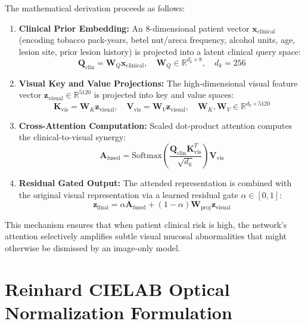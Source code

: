\documentclass[12pt,a4paper,oneside]{report}
\begin{document}
The mathematical derivation proceeds as follows:
\begin{enumerate}
    \item \textbf{Clinical Prior Embedding:} An 8-dimensional patient vector $\mathbf{x}_{\text{clinical}}$ (encoding tobacco pack-years, betel nut/areca frequency, alcohol units, age, lesion site, prior lesion history) is projected into a latent clinical query space:
    \begin{equation}
        \mathbf{Q}_{\text{clin}} = \mathbf{W}_Q \mathbf{x}_{\text{clinical}}, \quad \mathbf{W}_Q \in \mathbb{R}^{d_k \times 8}, \quad d_k = 256
    \end{equation}
    \item \textbf{Visual Key and Value Projections:} The high-dimensional visual feature vector $\mathbf{z}_{\text{visual}} \in \mathbb{R}^{5120}$ is projected into key and value spaces:
    \begin{equation}
        \mathbf{K}_{\text{vis}} = \mathbf{W}_K \mathbf{z}_{\text{visual}}, \quad \mathbf{V}_{\text{vis}} = \mathbf{W}_V \mathbf{z}_{\text{visual}}, \quad \mathbf{W}_K, \mathbf{W}_V \in \mathbb{R}^{d_k \times 5120}
    \end{equation}
    \item \textbf{Cross-Attention Computation:} Scaled dot-product attention computes the clinical-to-visual synergy:
    \begin{equation}
        \mathbf{A}_{\text{fused}} = \text{Softmax}\left( \frac{\mathbf{Q}_{\text{clin}} \mathbf{K}_{\text{vis}}^T}{\sqrt{d_k}} \right) \mathbf{V}_{\text{vis}}
    \end{equation}
    \item \textbf{Residual Gated Output:} The attended representation is combined with the original visual representation via a learned residual gate $\alpha \in [0, 1]$:
    \begin{equation}
        \mathbf{z}_{\text{final}} = \alpha \mathbf{A}_{\text{fused}} + (1 - \alpha) \mathbf{W}_{\text{proj}} \mathbf{z}_{\text{visual}}
    \end{equation}
\end{enumerate}

This mechanism ensures that when patient clinical risk is high, the network's attention selectively amplifies subtle visual mucosal abnormalities that might otherwise be dismissed by an image-only model.

\section{Reinhard CIELAB Optical Normalization Formulation}
\label{sec:reinhard_formulation}
\end{document}

